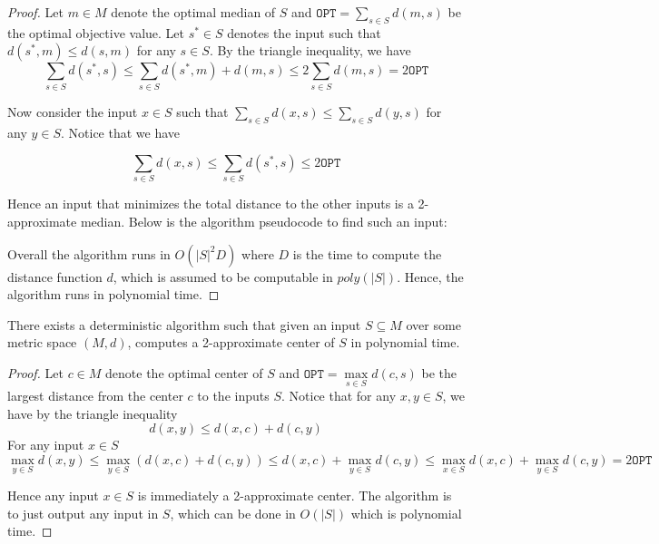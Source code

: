 \begin{proof}
    Let $m \in M$ denote the optimal median of $S$ and $\texttt{OPT} = \sum\limits_{s \in S} d(m, s)$ be the optimal objective value. Let $s^* \in S$ denotes the input such that $d(s^*, m) \leq d(s, m)$ for any $s \in S$. By the triangle inequality, we have
    \[\sum_{s \in S} d(s^*, s) \leq \sum_{s \in S} d(s^*, m) + d(m, s) \leq 2 \sum_{s \in S} d(m, s) = 2 \texttt{OPT}\]

    Now consider the input $x \in S$ such that $\sum\limits_{s \in S} d(x, s) \leq \sum\limits_{s \in S} d(y, s)$ for any $y \in S$. Notice that we have

    \[\sum_{s \in S} d(x, s) \leq \sum_{s \in S} d(s^*, s) \leq 2 \texttt{OPT}\]

    Hence an input that minimizes the total distance to the other inputs is a 2-approximate median. Below is the algorithm pseudocode to find such an input:

    

    Overall the algorithm runs in $O(|S|^2 D)$ where $D$ is the time to compute the distance function $d$, which is assumed to be computable in $poly(|S|)$. Hence, the algorithm runs in polynomial time.
\end{proof}

\begin{theorem}
\label{Folklore Center}
    There exists a deterministic algorithm such that given an input $S \subseteq M$ over some metric space $(M, d)$, computes a 2-approximate center of $S$ in polynomial time.
\end{theorem}

\begin{proof}
    Let $c \in M$ denote the optimal center of $S$ and $\texttt{OPT} = \max\limits_{s \in S} d(c, s)$ be the largest distance from the center $c$ to the inputs $S$. Notice that for any $x, y \in S$, we have by the triangle inequality
    \[d(x, y) \leq d(x, c) + d(c, y)\]
    For any input $x \in S$
    \[\max_{y \in S} d(x, y) \leq \max_{y \in S} (d(x, c) + d(c, y)) \leq d(x, c) + \max_{y \in S} d(c, y) \leq \max_{x \in S} d(x, c) + \max_{y \in S} d(c, y)= 2 \texttt{OPT}\]

    Hence any input $x \in S$ is immediately a 2-approximate center. The algorithm is to just output any input in $S$, which can be done in $O(|S|)$ which is polynomial time.
\end{proof}

